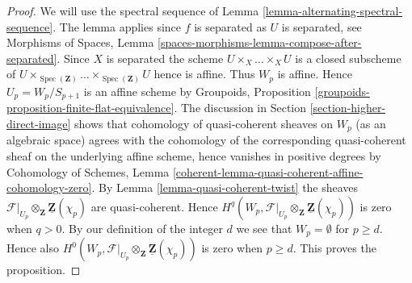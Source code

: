 \documentclass[10pt,a4paper]{amsart}
\theoremstyle{plain}
\theoremstyle{definition}
\theoremstyle{remark}
\numberwithin{equation}{subsection}
\def\Spec{\mathop{\mathrm{Spec}}}
\begin{document}
\begin{proof}
We will use the spectral sequence of
Lemma \ref{lemma-alternating-spectral-sequence}.
The lemma applies since $f$ is separated as $U$ is separated, see
Morphisms of Spaces, Lemma
\ref{spaces-morphisms-lemma-compose-after-separated}.
Since $X$ is separated the scheme $U \times_X \ldots \times_X U$ is a closed
subscheme of
$U \times_{\Spec(\mathbf{Z})} \ldots \times_{\Spec(\mathbf{Z})} U$
hence is affine. Thus $W_p$ is affine. Hence $U_p = W_p/S_{p + 1}$ is an
affine scheme by
Groupoids, Proposition \ref{groupoids-proposition-finite-flat-equivalence}.
The discussion in
Section \ref{section-higher-direct-image}
shows that cohomology of quasi-coherent sheaves on $W_p$ (as an algebraic
space) agrees with the cohomology of the corresponding quasi-coherent
sheaf on the underlying affine scheme, hence vanishes in positive degrees by
Cohomology of Schemes, Lemma
\ref{coherent-lemma-quasi-coherent-affine-cohomology-zero}.
By
Lemma \ref{lemma-quasi-coherent-twist}
the sheaves
$\mathcal{F}|_{U_p} \otimes_\mathbf{Z} \underline{\mathbf{Z}}(\chi_p)$
are quasi-coherent. Hence
$H^q(W_p,
\mathcal{F}|_{U_p} \otimes_\mathbf{Z} \underline{\mathbf{Z}}(\chi_p))$
is zero when $q > 0$. By our definition of the integer $d$ we see that
$W_p = \emptyset$ for $p \geq d$. Hence also
$H^0(W_p,
\mathcal{F}|_{U_p} \otimes_\mathbf{Z} \underline{\mathbf{Z}}(\chi_p))$
is zero when $p \geq d$.
This proves the proposition.
\end{proof}
\end{document}
